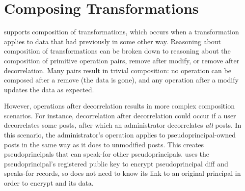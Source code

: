\section{Composing \Xxing Transformations}
\label{s:composition}

\sys supports composition of \xxing transformations, which occurs when a
transformation applies to data that \sys had previously \xxed in
some other way.
%
Reasoning about composition of transformations can be broken down to reasoning
about the composition of primitive operation pairs, \eg remove after
modify, or remove after decorrelation.
%
Many pairs result in trivial composition: no operation can be composed after a
remove (the data is gone), and any operation after a modify updates the
data as expected. %

However, operations after decorrelation results in more complex composition scenarios.
%
For instance, decorrelation after decorrelation could occur if a user
decorrelates some posts, after which an administrator decorrelates \emph{all}
posts. In this scenario, the administrator's \xxing operation applies to
pseudoprincipal-owned posts in the same way as it does to unmodified posts. This
creates pseudoprincipals that can speak-for other pseudoprincipals.  \sys uses
the pseudoprincipal's registered public key to encrypt pseudoprincipal diff and
speaks-for records, so \sys does not need to know its link to an original
principal in order to encrypt and \xx its data.
%

